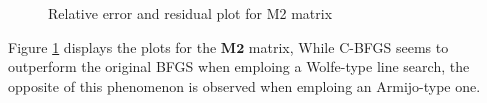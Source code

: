 \documentclass{article}
\numberwithin{equation}{section}
\begin{document}
\begin{figure}[H]
    \centering
  \hfill
  \caption{Relative error and residual plot for M2 matrix}
    \label{fig:err_bfgs_m2}
\end{figure}
Figure \ref{fig:err_bfgs_m2} displays the plots for the $\textbf{M2}$ matrix, While C-BFGS seems to outperform the original BFGS when emploing a Wolfe-type line search, the opposite of this phenomenon is observed when emploing an Armijo-type one. 
\\
\end{document}
